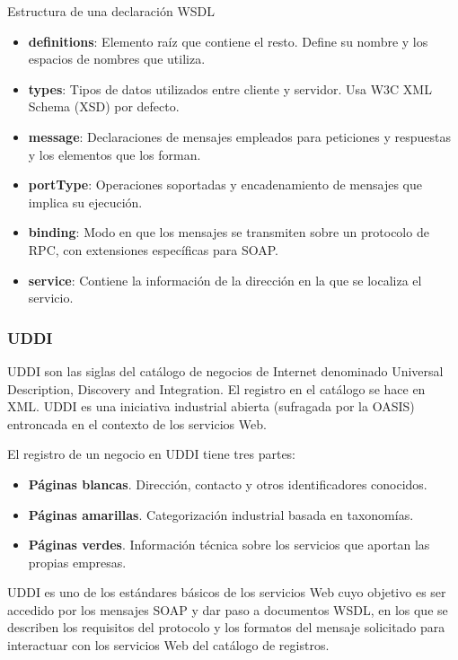 Estructura de una declaración WSDL
\begin{itemize}
\item \textbf{definitions}: Elemento raíz que contiene el resto. Define su
nombre y los espacios de nombres que utiliza.
\item \textbf{types}: Tipos de datos utilizados entre cliente y servidor. Usa
W3C XML Schema (XSD) por defecto.
\item \textbf{message}: Declaraciones de mensajes empleados para
peticiones y respuestas y los elementos que los forman.
\item \textbf{portType}: Operaciones soportadas y encadenamiento de
mensajes que implica su ejecución.
\item \textbf{binding}: Modo en que los mensajes se transmiten sobre un
protocolo de RPC, con extensiones específicas para SOAP.
\item \textbf{service}: Contiene la información de la dirección en la que se
localiza el servicio.

\end{itemize}

\subsubsection{UDDI}
\begin{defn}[UDDI]
UDDI son las siglas del catálogo de negocios de Internet denominado Universal Description, Discovery and Integration. El registro en el catálogo se hace en XML. UDDI es una iniciativa industrial abierta (sufragada por la OASIS) entroncada en el contexto de los servicios Web.
\end{defn}

El registro de un negocio en UDDI tiene tres partes:
\begin{itemize}
\item \textbf{Páginas blancas}. Dirección, contacto y otros identificadores conocidos.
\item \textbf{Páginas amarillas}. Categorización industrial basada en taxonomías.
\item \textbf{Páginas verdes}. Información técnica sobre los servicios que aportan las propias empresas.
\end{itemize}
UDDI es uno de los estándares básicos de los servicios Web cuyo objetivo es ser accedido por los mensajes SOAP y dar paso a documentos WSDL, en los que se describen los requisitos del protocolo y los formatos del mensaje solicitado para interactuar con los servicios Web del catálogo de registros.

